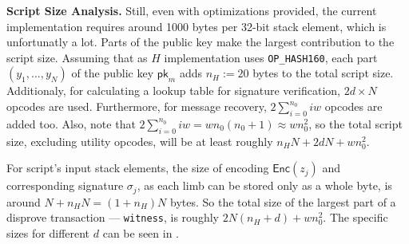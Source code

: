 \documentclass{iacrtrans}
\begin{document}
\textbf{Script Size Analysis.} Still, even with optimizations
provided, the current implementation requires around 1000 bytes per
32-bit stack element, which is unfortunatly a lot. Parts of the public
key make the largest contribution to the script size. Assuming that as
$H$ implementation uses \texttt{OP\_HASH160}, each part
$(y_1,\dots,y_N)$ of the public key $\mathsf{pk}_{m}$ adds $n_H := 20$ bytes to
the total script size. Additionaly, for calculating a lookup table for
signature verification, $2d \times N$ opcodes are used. Furthermore, for
message recovery, $2\sum_{i = 0}^{n_0} i w$ opcodes are added too. Also,
note that $2 \sum_{i = 0}^{n_0} i w = w n_0 (n_0+1) \approx w n_0^2$, so the
total script size, excluding utility opcodes, will be at least roughly
$n_HN + 2 dN + w n_0^2$.

For script's input stack elements, the size of encoding
$\mathsf{Enc}(z_j)$ and corresponding signature $\sigma_j$, as each limb
can be stored only as a whole byte, is around $N + n_HN = (1+n_H)N$
bytes. So the total size of the largest part of a disprove transaction
--- \texttt{witness}, is roughly $2N(n_H + d) + wn_0^2$. The specific sizes 
for different $d$ can be seen in .
\end{document}
